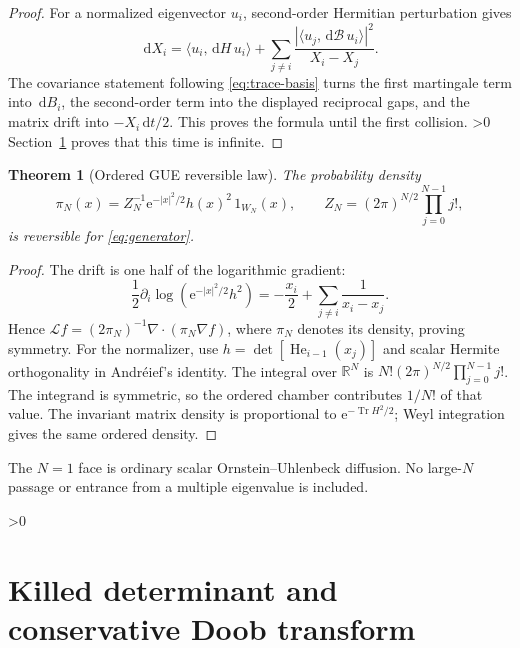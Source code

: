 \documentclass[10pt]{article}
\newcommand{\RR}{\mathbb R}
\newcommand{\e}{\mathrm e}
\newcommand{\dd}{\,\mathrm d}
\newcommand{\Tr}{\operatorname{Tr}}
\newtheorem{theorem}{Theorem}
\begin{document}
\begin{proof}
For a normalized eigenvector $u_i$, second-order Hermitian perturbation gives
\begin{equation}
 \dd X_i=\langle u_i,\dd H\,u_i\rangle+
 \sum_{j\ne i}\frac{|\langle u_j,\dd\mathcal B\,u_i\rangle|^2}{X_i-X_j}.
                                                        \label{eq:perturb}
\end{equation}
The covariance statement following \eqref{eq:trace-basis} turns the first
martingale term into $\dd B_i$, the second-order term into the displayed
reciprocal gaps, and the matrix drift into $-X_i\dd t/2$.  This proves the
formula until the first collision.
\ifnum\CRevisionRound>0
Section~\ref{sec:doob} proves that this time is infinite.
\fi
\end{proof}

\begin{theorem}[Ordered GUE reversible law]
The probability density
\begin{equation}
 \pi_N(x)=Z_N^{-1}\e^{-|x|^2/2}h(x)^2\,1_{W_N}(x),
 \qquad Z_N=(2\pi)^{N/2}\prod_{j=0}^{N-1}j!,          \label{eq:gue}
\end{equation}
is reversible for \eqref{eq:generator}.
\end{theorem}

\begin{proof}
The drift is one half of the logarithmic gradient:
\begin{equation}
 \frac12\partial_i\log(\e^{-|x|^2/2}h^2)
 =-\frac{x_i}{2}+\sum_{j\ne i}\frac1{x_i-x_j}.       \label{eq:log-gradient}
\end{equation}
Hence $\mathcal Lf=(2\pi_N)^{-1}\nabla\!\cdot(\pi_N\nabla f)$, where
$\pi_N$ denotes its density, proving symmetry.  For the normalizer, use
$h=\det[\operatorname{He}_{i-1}(x_j)]$ and scalar Hermite orthogonality in
Andr\'eief's identity.  The integral over $\RR^N$ is
$N!(2\pi)^{N/2}\prod_{j=0}^{N-1}j!$.  The integrand is symmetric, so the
ordered chamber contributes $1/N!$ of that value.  The invariant matrix
density is proportional to $\e^{-\Tr H^2/2}$; Weyl integration gives the same
ordered density.
\end{proof}

The $N=1$ face is ordinary scalar Ornstein--Uhlenbeck diffusion.  No
large-$N$ passage or entrance from a multiple eigenvalue is included.

\ifnum\CRevisionRound>0
\section{Killed determinant and conservative Doob transform}
\label{sec:doob}
\end{document}
